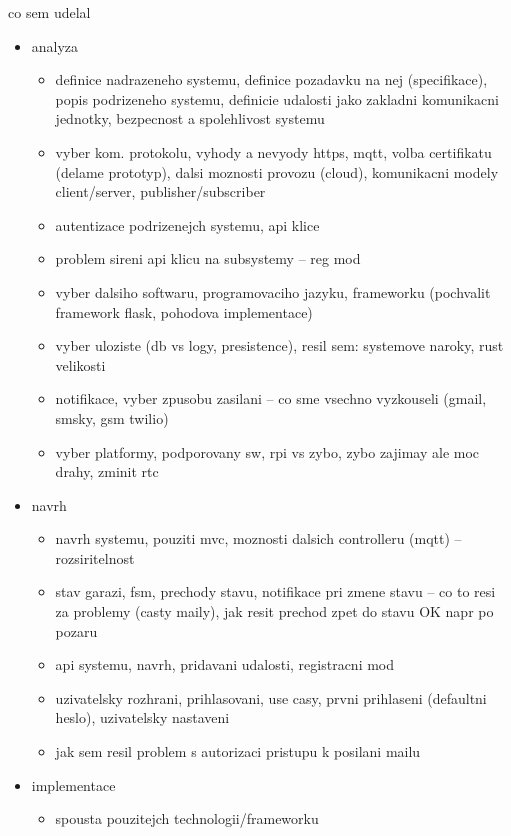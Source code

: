 co sem udelal

\begin{itemize}
    \item analyza
    \begin{itemize}
    \item definice nadrazeneho systemu, definice pozadavku na nej (specifikace), popis podrizeneho systemu, definicie udalosti jako zakladni komunikacni jednotky, bezpecnost a spolehlivost systemu
    \item vyber kom. protokolu, vyhody a nevyody https, mqtt, volba certifikatu (delame prototyp), dalsi moznosti provozu (cloud), komunikacni modely client/server, publisher/subscriber
    \item autentizace podrizenejch systemu, api klice
    \item problem sireni api klicu na subsystemy -- reg mod
    \item vyber dalsiho softwaru, programovaciho jazyku, frameworku (pochvalit framework flask, pohodova implementace)
    \item vyber uloziste (db vs logy, presistence), resil sem: systemove naroky, rust velikosti
    \item notifikace, vyber zpusobu zasilani -- co sme vsechno vyzkouseli (gmail, smsky, gsm twilio)
    \item vyber platformy, podporovany sw, rpi vs zybo, zybo zajimay ale moc drahy, zminit rtc
    \end{itemize}
    \item navrh
    \begin{itemize}
        \item navrh systemu, pouziti mvc, moznosti dalsich controlleru (mqtt) -- rozsiritelnost
        \item stav garazi, fsm, prechody stavu, notifikace pri zmene stavu -- co to resi za problemy (casty maily), jak resit prechod zpet do stavu OK napr po pozaru
        \item api systemu, navrh, pridavani udalosti, registracni mod
        \item uzivatelsky rozhrani, prihlasovani, use casy, prvni prihlaseni (defaultni heslo), uzivatelsky nastaveni
        \item jak sem resil problem s autorizaci pristupu k posilani mailu
    \end{itemize}
    \item implementace
    \begin{itemize}
        \item spousta pouzitejch technologii/frameworku

\end{itemize}
\end{itemize}

